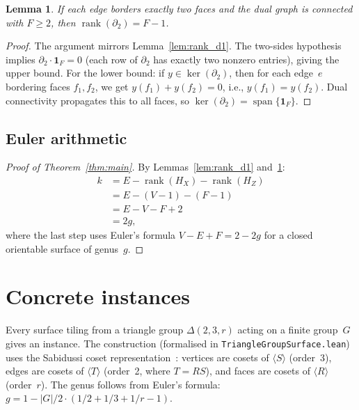 \documentclass[11pt,a4paper]{article}
\newtheorem{lemma}[theorem]{Lemma}
\begin{document}
\begin{lemma}\label{lem:rank_d2}
If each edge borders exactly two faces and the dual graph is connected with
$F \geq 2$, then $\operatorname{rank}(\partial_2) = F - 1$.
\end{lemma}

\begin{proof}
The argument mirrors Lemma~\ref{lem:rank_d1}. The two-sides hypothesis
implies $\partial_2 \cdot \mathbf{1}_F = 0$ (each row of $\partial_2$ has
exactly two nonzero entries), giving the upper bound. For the lower bound:
if $y \in \ker(\partial_2)$, then for each edge~$e$ bordering faces
$f_1, f_2$, we get $y(f_1) + y(f_2) = 0$, i.e., $y(f_1) = y(f_2)$.
Dual connectivity propagates this to all faces, so
$\ker(\partial_2) = \operatorname{span}\{\mathbf{1}_F\}$.
\end{proof}

\subsection{Euler arithmetic}

\begin{proof}[Proof of Theorem~\ref{thm:main}]
By Lemmas~\ref{lem:rank_d1} and~\ref{lem:rank_d2}:
\begin{align*}
  k &= E - \operatorname{rank}(H_X) - \operatorname{rank}(H_Z) \\
    &= E - (V - 1) - (F - 1) \\
    &= E - V - F + 2 \\
    &= 2g,
\end{align*}
where the last step uses Euler's formula $V - E + F = 2 - 2g$ for a closed
orientable surface of genus~$g$.
\end{proof}


\section{Concrete instances}\label{sec:instances}

Every surface tiling from a triangle group $\Delta(2,3,r)$ acting on a finite
group~$G$ gives an instance. The construction
(formalised in \texttt{TriangleGroupSurface.lean}) uses
the Sabidussi coset representation~\cite{langer2014}: vertices are cosets
of $\langle S \rangle$ (order~3), edges are cosets of $\langle T \rangle$
(order~2, where $T = RS$), and faces are cosets of $\langle R \rangle$
(order~$r$). The genus follows from Euler's formula: $g = 1 - |G|/2 \cdot
(1/2 + 1/3 + 1/r - 1)$.
\end{document}
